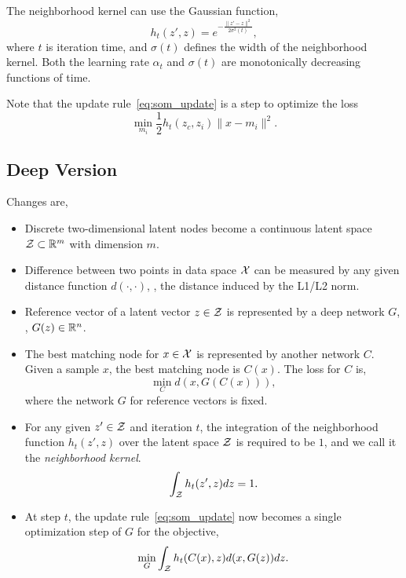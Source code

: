 The neighborhood kernel can use the Gaussian function,
\begin{equation}
    h_t(z',z) = e^{-\frac{\|z' - z\|^2}{2\sigma^2(t)}},
\end{equation}
where \(t\) is iteration time,
and \(\sigma(t)\) defines the width of the neighborhood kernel.
Both the learning rate \(\alpha_t\) and \(\sigma(t)\) are monotonically decreasing functions of time.

Note that the update rule~\eqref{eq:som_update} is a step to optimize the loss
\begin{equation}
    \min_{m_i} \frac{1}{2}h_t(z_c,z_i)\|x-m_i\|^2.
\end{equation}

\subsection{Deep Version}

Changes are,

\begin{itemize}
    \item Discrete two-dimensional latent nodes become a continuous latent space \(\mathcal{Z}\subset{\mathbb{R}}^m\) with dimension \(m\).
    \item Difference between two points in data space \(\mathcal{X}\) can be measured by any given distance function \(d(\cdot,\cdot)\),
        \eg, the distance induced by the L1/L2 norm.
    \item Reference vector of a latent vector \(z\in\mathcal{Z}\) is represented by a deep network \(G\), \ie, \(G(z)\in{\mathbb{R}}^n\).
    \item The best matching node for \(x\in\mathcal{X}\) is represented by another network \(C\).
        Given a sample \(x\),
        the best matching node is \(C(x)\).
        The loss for \(C\) is,
        \begin{equation}\label{eq:soae_c}
            \min_C d(x, G(C(x))),
        \end{equation}
        where the network \(G\) for reference vectors is fixed.
    \item For any given \(z'\in\mathcal{Z}\) and iteration \(t\),
        the integration of the neighborhood function \(h_t(z',z)\) over the latent space \(\mathcal{Z}\) is required to be \(1\),
        and we call it the \emph{neighborhood kernel}.
        \begin{equation}
            \int_{\mathcal{Z}} h_t(z',z)dz = 1.
        \end{equation}
    \item At step \(t\), the update rule~\eqref{eq:som_update} now becomes a single optimization step of \(G\) for the objective,
        \begin{equation}\label{eq:deep_update}
            \min_G \int_{\mathcal{Z}}h_t(C(x), z)d(x, G(z))dz.
        \end{equation}
\end{itemize}

